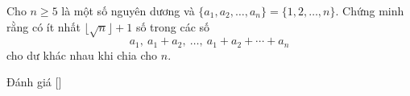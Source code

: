 \ifshowproblem
\begin{problem}\label{problem:ROU-2015-SOM-J-P4}
    Cho \( n \ge 5 \) là một số nguyên dương và \( \{a_1,a_2,\ldots,a_n\} = \{1,2,\ldots,n\} \). 
    Chứng minh rằng có ít nhất \( \lfloor \sqrt{n} \rfloor + 1 \) số trong các số 
    \[
        a_1,\ a_1 + a_2,\ \ldots,\ a_1 + a_2 + \cdots + a_n
    \]
    cho dư khác nhau khi chia cho \( n \).
\end{problem}
\fi

\ifshowinfo
Đánh giá [\textbf{}]\footnotemark
{}
\fi
